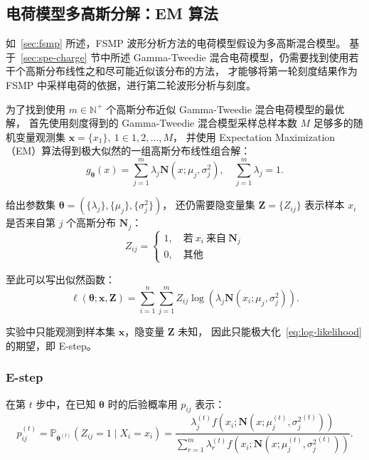 \subsection{电荷模型多高斯分解：EM 算法}\label{sec:em}
如~\ref{sec:fsmp} 所述，FSMP 波形分析方法的电荷模型假设为多高斯混合模型。
基于~\ref{sec:spe-charge} 节中所述 Gamma-Tweedie 混合电荷模型，仍需要找到使用若干个高斯分布线性之和尽可能近似该分布的方法，
才能够将第一轮刻度结果作为 FSMP 中采样电荷的依据，进行第二轮波形分析与刻度。

为了找到使用 $m\in\mathbb{N}^{+}$ 个高斯分布近似 Gamma-Tweedie 混合电荷模型的最优解，
首先使用刻度得到的 Gamma-Tweedie 混合模型采样总样本数 $M$ 足够多的随机变量观测集 $\boldsymbol{x}=\{x_1\},\ 1\in{1, 2, \ldots, M}$，
并使用 Expectation Maximization（EM）算法得到极大似然的一组高斯分布线性组合解：
\begin{equation}
    g_{\boldsymbol{\theta}}(x)=\sum_{j=1}^m\lambda_j\mathbf{N}(x;\mu_j, \sigma_j^2),\quad\sum_{j=1}^{m}\lambda_j=1.
\end{equation}

给出参数集 $\boldsymbol{\theta}=(\{\lambda_{j}\},\{\mu_j\},\{\sigma_j^2\})$，
还仍需要隐变量集 $\boldsymbol{Z}=\{Z_{ij}\}$ 表示样本 $x_i$ 是否来自第 $j$ 个高斯分布 $\mathbf{N}_j$：
\begin{equation}
    Z_{ij}=
    \begin{cases}
    1,\quad\text{若}\ x_i\ \text{来自}\ \mathbf{N}_j \\
    0,\quad\text{其他}
    \end{cases}
\end{equation}

至此可以写出似然函数：
\begin{equation}
    \label{eq:log-likelihood}
    \ell(\boldsymbol{\theta};\mathbf{x},\mathbf{Z})=
    \sum_{i=1}^n\sum_{j=1}^mZ_{ij}\log\left(\lambda_j\mathbf{N}(x_i;\mu_j, \sigma_j^2)\right).
\end{equation}

实验中只能观测到样本集 $\boldsymbol{x}$，隐变量 $\boldsymbol{Z}$ 未知，
因此只能极大化~\eqref{eq:log-likelihood} 的期望，即 E-step。

\subsubsection{E-step}
在第 $t$ 步中，在已知 $\boldsymbol{\theta}$ 时的后验概率用 $p_{ij}$ 表示：
\begin{equation}
    p_{ij}^{(t)}=\mathbb{P}_{\boldsymbol{\theta}^{(t)}}\left(Z_{ij}=1
    \mid X_i=x_i\right)=\frac{\lambda_j^{(t)}f(x_i;\mathbf{N}(x;\mu_j^{(t)}, {\sigma_j^2}^{(t)}))}
    {\sum_{r=1}^m\lambda_r^{(t)}f(x_i;\mathbf{N}(x;\mu_j^{(t)}, {\sigma_j^2}^{(t)}))}.
\end{equation}

